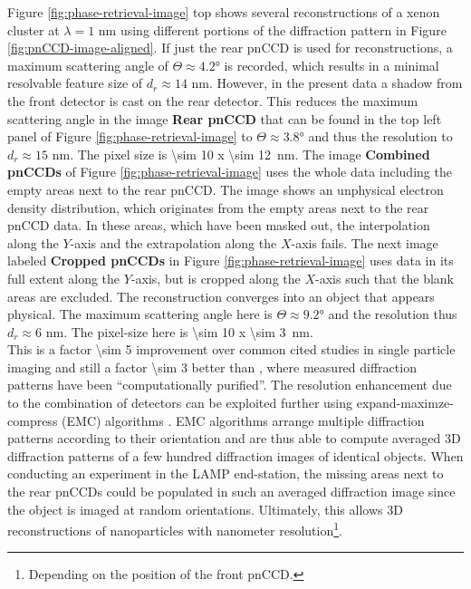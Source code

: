 Figure \ref{fig:phase-retrieval-image} top shows several reconstructions of a xenon cluster at $\lambda = 1$ nm using different portions of the diffraction pattern in Figure \ref{fig:pnCCD-image-aligned}. If just the rear pnCCD is used for reconstructions, a maximum scattering angle of $\Theta\approx 4.2$° is recorded, which results in a minimal resolvable feature size of $d_{r}\approx 14$ nm. However, in the present data a shadow from the front detector is cast on the rear detector. This reduces the maximum scattering angle in the image \textbf{Rear pnCCD} that can be found in the top left panel of Figure \ref{fig:phase-retrieval-image} to $\Theta\approx 3.8$° and thus the resolution to $d_{r}\approx 15$ nm. The pixel size is \SI{\sim 10 x \sim 12}{\nano\meter}. The image \textbf{Combined pnCCDs} of Figure \ref{fig:phase-retrieval-image} uses the whole data including the empty areas next to the rear pnCCD. The image shows an unphysical electron density distribution, which originates from the empty areas next to the rear pnCCD data. In these areas, which have been masked out, the interpolation along the $Y$-axis and the extrapolation along the $X$-axis fails. The next image labeled \textbf{Cropped pnCCDs} in Figure \ref{fig:phase-retrieval-image} uses data in its full extent along the $Y$-axis, but is cropped along the $X$-axis such that the blank areas are excluded. The reconstruction converges into an object that appears physical. The maximum scattering angle here is $\Theta \approx 9.2$° and the resolution thus $d_{r}\approx 6$ nm. The pixel-size here is \SI{\sim 10 x \sim 3}{\nano\meter}.\\[1\baselineskip]
%
This is a factor \num{\sim 5} improvement over common cited studies in single particle imaging \citep{Seibert-2011-Nature} and still a factor \num{\sim 3} better than \citep{Hantke-2014-NatPho}, where measured diffraction patterns have been ``computationally purified''. The resolution enhancement due to the combination of detectors can be exploited further using expand-maximze-compress (EMC) algorithms \citep{Loh-2009-PRE}. EMC algorithms arrange multiple diffraction patterns according to their orientation and are thus able to compute averaged 3D diffraction patterns of a few hundred diffraction images of identical objects. When conducting an experiment in the LAMP end-station, the missing areas next to the rear pnCCDs could be populated in such an averaged diffraction image since the object is imaged at random orientations. Ultimately, this allows 3D reconstructions of nanoparticles with nanometer resolution\footnote{Depending on the position of the front pnCCD.}.\\
%
%
%
